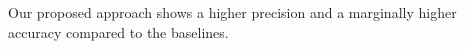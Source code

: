 Our proposed approach shows a higher precision
and a marginally higher accuracy compared to the baselines.
